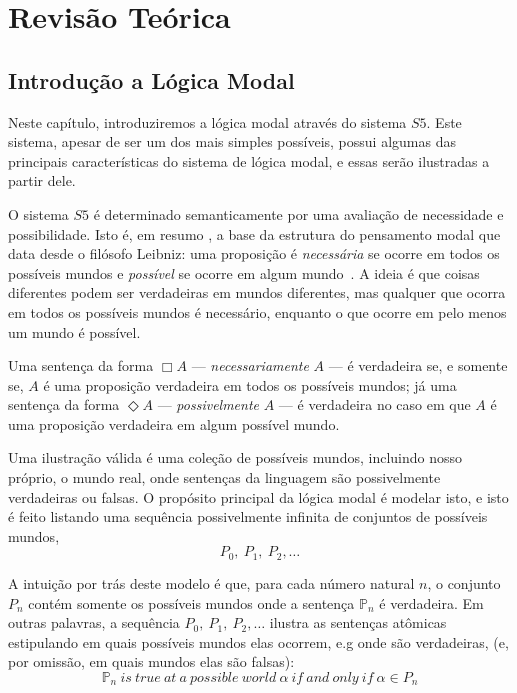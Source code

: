 \chapter{Revisão Teórica}
\section{Introdução a Lógica Modal}
\label{sec:l_gica_modal}
Neste capítulo, introduziremos a lógica modal através do sistema $S5$. Este
sistema, apesar de ser um dos mais simples possíveis, possui algumas das
principais características do sistema de lógica modal, e essas serão ilustradas
a partir dele. 

O sistema $S5$ é determinado semanticamente por uma avaliação de necessidade e
possibilidade.
Isto é, em resumo %
, a base da estrutura do pensamento modal que data desde o filósofo Leibniz: uma
proposição é \textit{necessária} se ocorre em todos os possíveis mundos 
e \textit{possível} se ocorre em algum mundo~\cite{chellas:modal_logic}.
A ideia é que coisas %
diferentes podem ser verdadeiras em mundos diferentes, mas qualquer que ocorra
em todos os possíveis mundos é necessário, enquanto o que ocorre em pelo menos
um mundo é possível.


Uma sentença da forma $\Box A$ --- \textit{necessariamente} $A$ --- é verdadeira se,
e somente se, $A$ é uma proposição verdadeira em todos os possíveis mundos; já
uma sentença da forma $\Diamond A$ --- \textit{possivelmente} $A$ --- é verdadeira
no caso em que $A$ é uma proposição verdadeira em algum possível mundo.

Uma ilustração válida é uma coleção de possíveis mundos, incluindo nosso
próprio, o mundo real, onde sentenças da linguagem são possivelmente verdadeiras
ou falsas. O propósito principal da lógica modal é modelar isto, e isto é feito
listando uma sequência possivelmente infinita de conjuntos de possíveis mundos,
\begin{equation}
    P_0,\ P_1,\ P_2,\ldots
\end{equation}

A intuição por trás deste modelo é que, para cada número natural $n$, o conjunto
$P_n$ contém somente os possíveis mundos onde a sentença $\mathbb{P}_n$ é
verdadeira. Em outras palavras, a sequência 
$P_0,\ P_1,\ P_2,\ldots$
ilustra as sentenças at\^omicas estipulando em quais possíveis mundos elas
ocorrem, e.g onde são verdadeiras,
(e, por omissão, em quais mundos elas são falsas):
\begin{equation}
    \mathbb{P}_n\ is\ true\ at\ a\ possible\ world\ \alpha\ if\ and\ only\ if\
    \alpha \in P_n 
\end{equation}

